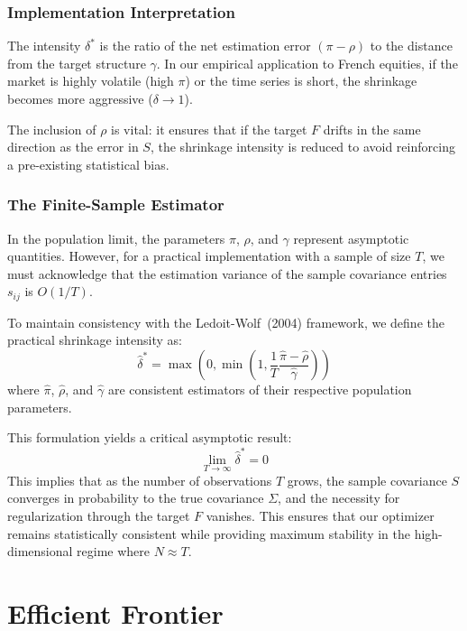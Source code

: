 \documentclass[11pt,a4paper]{article}
\begin{document}
\subsubsection{Implementation Interpretation}
The intensity $\delta^*$ is the ratio of the net estimation error $(\pi - \rho)$ to the distance from the target structure $\gamma$. In our empirical application to French equities, if the market is highly volatile (high $\pi$) or the time series is short, the shrinkage becomes more aggressive ($\delta \to 1$). 

The inclusion of $\rho$ is vital: it ensures that if the target $F$ drifts in the same direction as the error in $S$, the shrinkage intensity is reduced to avoid reinforcing a pre-existing statistical bias.

\subsubsection{The Finite-Sample Estimator}
In the population limit, the parameters $\pi$, $\rho$, and $\gamma$ represent asymptotic quantities. However, for a practical implementation with a sample of size $T$, we must acknowledge that the estimation variance of the sample covariance entries $s_{ij}$ is $O(1/T)$. 

To maintain consistency with the Ledoit-Wolf~(2004) framework, we define the practical shrinkage intensity as:
\begin{equation}
\hat{\delta}^* = \max \left( 0, \min \left( 1, \frac{1}{T} \frac{\hat{\pi} - \hat{\rho}}{\hat{\gamma}} \right) \right)
\end{equation}
where $\hat{\pi}$, $\hat{\rho}$, and $\hat{\gamma}$ are consistent estimators of their respective population parameters. 

This formulation yields a critical asymptotic result:
\begin{equation}
\lim_{T \to \infty} \hat{\delta}^* = 0
\end{equation}
This implies that as the number of observations $T$ grows, the sample covariance $S$ converges in probability to the true covariance $\Sigma$, and the necessity for regularization through the target $F$ vanishes. This ensures that our optimizer remains statistically consistent while providing maximum stability in the high-dimensional regime where $N \approx T$.

\newpage
\section{Efficient Frontier}
\end{document}
